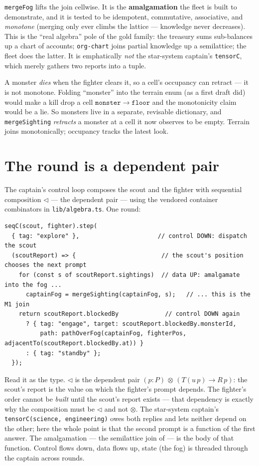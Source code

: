 \documentclass[11pt]{article}
\newcommand{\code}[1]{\texttt{#1}}
\begin{document}
\code{mergeFog} lifts the join cellwise. It is the \textbf{amalgamation} the fleet is
built to demonstrate, and it is tested to be idempotent, commutative, associative,
and \emph{monotone} (merging only ever climbs the lattice --- knowledge never
decreases). This is the ``real algebra'' pole of the gold family: the treasury sums
sub-balances up a chart of accounts; \code{org-chart} joins partial knowledge up a
semilattice; the fleet does the latter. It is emphatically \emph{not} the
star-system captain's \code{tensorC}, which merely gathers two reports into a tuple.

\begin{keybox}
A monster \emph{dies} when the fighter clears it, so a cell's occupancy can retract
--- it is not monotone. Folding ``monster'' into the terrain enum (as a first draft
did) would make a kill drop a cell $\mathtt{monster} \to \mathtt{floor}$ and the
monotonicity claim would be a lie. So monsters live in a separate, revisable
dictionary, and \code{mergeSighting} \emph{retracts} a monster at a cell it now
observes to be empty. Terrain joins monotonically; occupancy tracks the latest look.
\end{keybox}

\section{The round is a dependent pair}

The captain's control loop composes the scout and the fighter with sequential
composition $\lhd$ --- the dependent pair --- using the vendored container
combinators in \code{lib/algebra.ts}. One round:

\begin{lstlisting}[language=TS]
seqC(scout, fighter).step(
  { tag: "explore" },                      // control DOWN: dispatch the scout
  (scoutReport) => {                        // the scout's position chooses the next prompt
    for (const s of scoutReport.sightings)  // data UP: amalgamate into the fog ...
      captainFog = mergeSighting(captainFog, s);   // ... this is the M1 join
    return scoutReport.blockedBy             // control DOWN again
      ? { tag: "engage", target: scoutReport.blockedBy.monsterId,
          path: pathOverFog(captainFog, fighterPos, adjacentTo(scoutReport.blockedBy.at)) }
      : { tag: "standby" };
  });
\end{lstlisting}

Read it as the type. $\lhd$ is the dependent pair $(p : P)\,\otimes\,(T(u\,p) \to
R\,p)$: the scout's report is the value on which the fighter's prompt depends. The
fighter's order cannot be \emph{built} until the scout's report exists --- that
dependency is exactly why the composition must be $\lhd$ and not $\otimes$. The
star-system captain's \code{tensorC(science, engineering)} owes both replies and
lets neither depend on the other; here the whole point is that the second prompt is a
function of the first answer. The amalgamation --- the semilattice join of
 --- is the body of that function. Control flows down, data flows up,
state (the fog) is threaded through the captain across rounds.
\end{document}

